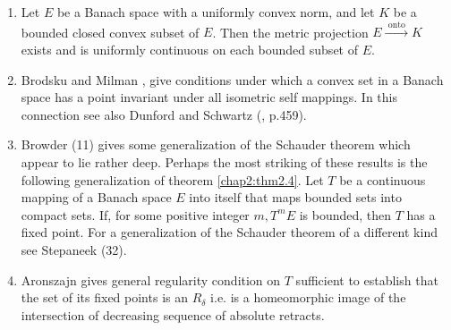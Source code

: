 \begin{enumerate}[(1)]
 \item Let $E$ be a Banach space with a uniformly convex norm, and let
   $K$ be a bounded closed convex subset of $E$. Then the metric
   projection $E \xrightarrow{\text{ onto }}K$ exists and is
   uniformly continuous on each bounded subset of $E$. 

 \item Brodsku and Milman \cite{key10}, give conditions under which a convex
   set in a Banach space has a point invariant under all isometric
   self mappings. In this connection see also Dunford and Schwartz
   (\cite{key14}, p.459).  

 \item Browder (11) gives some generalization of the Schauder theorem
   which appear to lie rather deep. Perhaps the most striking of these
   results is the following generalization of theorem
   \ref{chap2:thm2.4}. Let $T$ be 
   a continuous mapping of a Banach space $E$ into itself that maps
   bounded sets into compact sets. If, for some positive integer $m,
   T^m E$ is bounded, then $T$ has a fixed point. For a generalization
   of the Schauder theorem of a different kind see Stepaneek (32). 

 \item Aronszajn \cite{key2} gives general regularity condition on $T$
   sufficient to establish that the set of its fixed points is an
   $R_\delta$ i.e. is a homeomorphic image of the intersection of
   decreasing sequence of absolute retracts. 
\end{enumerate}
